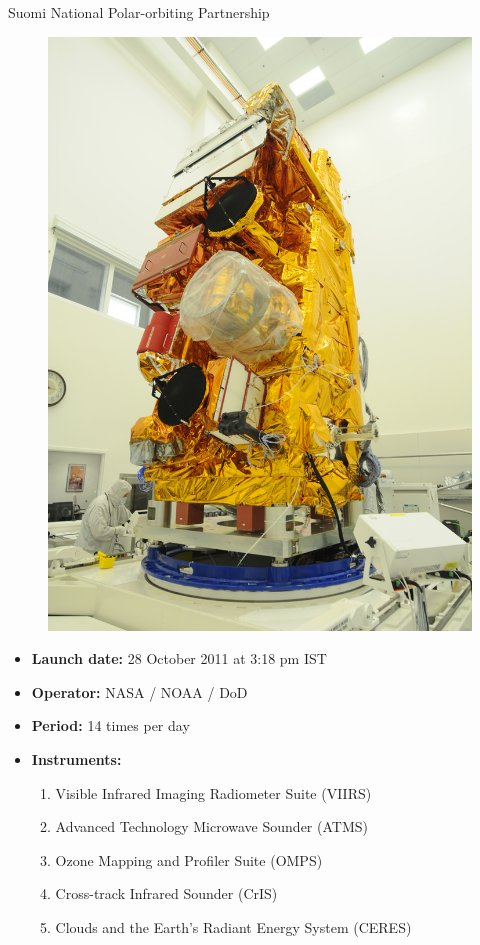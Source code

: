 \documentclass[aspectratio=169]{beamer} %
\begin{document}
  \begin{frame}{Suomi National Polar-orbiting Partnership}
    \noindent\begin{minipage}{0.273\textwidth}
      \begin{figure}
        \includegraphics[width=1.2\linewidth]{NPP_satellite_in_cleanroom.jpeg}
      \end{figure}
    \end{minipage}%
    \hfill%
    \begin{minipage}{0.6\textwidth}\raggedleft
      \begin{itemize}
        \item \textbf{Launch date:} 28 October 2011 at 3:18 pm IST
        \item \textbf{Operator:} 	NASA / NOAA / DoD
        \item \textbf{Period:} 14 times per day 
        \item \textbf{Instruments:} 
        \begin{enumerate}
          \item Visible Infrared Imaging Radiometer Suite (VIIRS)
          \item Advanced Technology Microwave Sounder (ATMS)
          \item Ozone Mapping and Profiler Suite (OMPS)
          \item Cross-track Infrared Sounder (CrIS)
          \item Clouds and the Earth's Radiant Energy System (CERES)
          

\end{enumerate}
\end{itemize}
\end{minipage}
\end{frame}
\end{document}
